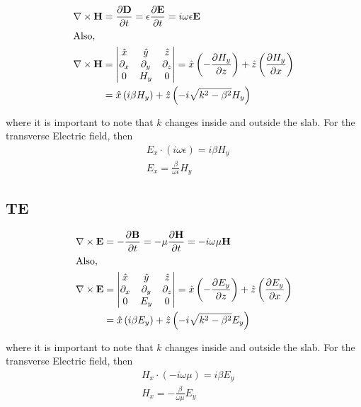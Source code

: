 \documentclass[11pt, oneside]{article}   	%
\begin{document}
\begin{align}
\nabla \times \mathbf{H} &= \frac{\partial \mathbf{D}}{\partial t} = \epsilon \frac{\partial \mathbf{E}}{\partial t} = i\omega \epsilon \mathbf{E}\\
\intertext{Also,}
\nabla \times \mathbf{H} &= \begin{vmatrix}
\hat{x}& \hat{y}& \hat{z}\\
\partial_{x}& \partial_{y}& \partial_{z}\\
0& H_{y}& 0
\end{vmatrix} = \hat{x} \left( -\frac{\partial H_{y}}{\partial z}\right) + \hat{z} \left( \frac{\partial H_{y}}{\partial x}\right)\\
&= \hat{x} \left( i\beta H_{y}\right) + \hat{z} \left( -i\sqrt{k^{2}-\beta^{2}} H_{y}\right)
\end{align}

\noindent where it is important to note that $k$ changes inside and outside the slab.  For the transverse Electric field, then
\begin{align}
&E_{x} \cdot (i\omega \epsilon) = i\beta H_{y}\\
&E_{x} = \frac{\beta}{\omega \epsilon} H_{y} \label{eq:ex-def}
\end{align}

\subsection{TE}

\begin{align}
\nabla \times \mathbf{E} &= -\frac{\partial \mathbf{B}}{\partial t} = -\mu \frac{\partial \mathbf{H}}{\partial t} = -i\omega \mu \mathbf{H}\\
\intertext{Also,}
\nabla \times \mathbf{E} &= \begin{vmatrix}
\hat{x}& \hat{y}& \hat{z}\\
\partial_{x}& \partial_{y}& \partial_{z}\\
0& E_{y}& 0
\end{vmatrix} = \hat{x} \left( -\frac{\partial E_{y}}{\partial z}\right) + \hat{z} \left( \frac{\partial E_{y}}{\partial x}\right)\\
&= \hat{x} \left( i\beta E_{y}\right) + \hat{z} \left( -i\sqrt{k^{2}-\beta^{2}} E_{y}\right)
\end{align}

\noindent where it is important to note that $k$ changes inside and outside the slab.  For the transverse Electric field, then
\begin{align}
&H_{x} \cdot (-i\omega \mu) = i\beta E_{y}\\
&H_{x} = -\frac{\beta}{\omega \mu} E_{y} \label{eq:hx-def}
\end{align}
 
\end{document}
